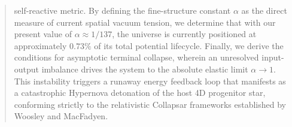 \documentclass[11pt,a4paper]{article}
\theoremstyle{plain}
\theoremstyle{definition}
\theoremstyle{remark}
\begin{document}
\begin{abstract}
self-reactive metric. By defining the fine-structure constant $\alpha$ as the direct measure of current spatial vacuum tension, we determine that with our present value of $\alpha \approx 1/137$, the universe is currently positioned at approximately $0.73\%$ of its total potential lifecycle. Finally, we derive the conditions for asymptotic terminal collapse, wherein an unresolved input-output imbalance drives the system to the absolute elastic limit $\alpha \to 1$. This instability triggers a runaway energy feedback loop that manifests as a catastrophic Hypernova detonation of the host 4D progenitor star, conforming strictly to the relativistic Collapsar frameworks established by Woosley and MacFadyen.
\end{abstract}

\newpage
\tableofcontents
\newpage
\end{document}

